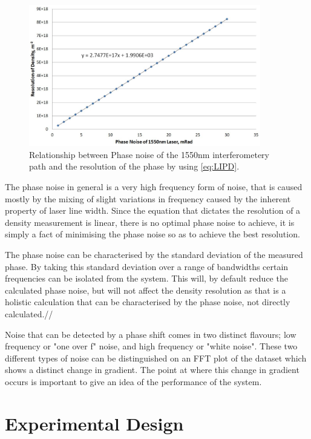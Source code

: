 \documentclass[12pt,a4paper,oneside]{report}
\begin{document}
\begin{figure}[H]
\includegraphics[width=0.9\textwidth, center,angle=0]{DImages/pn-density-relationship.JPG}
\caption{Relationship between Phase noise of the 1550nm interferometery path and the resolution of the phase by using \autoref{eq:LIPD}.}
\label{pn_density}
\end{figure}

The phase noise in general is a very high frequency form of noise, that is caused mostly by the mixing of slight variations in frequency caused by the inherent property of laser line width.
Since the equation that dictates the resolution of a density measurement is linear, there is no optimal phase noise to achieve, it is simply a fact of minimising the phase noise so as to achieve the best resolution. 

The phase noise can be characterised by the standard deviation of the measured phase. By taking this standard deviation over a range of bandwidths certain frequencies can be isolated from the system. This will, by default reduce the calculated phase noise, but will not affect the density resolution as that is a holistic calculation that can be characterised by the phase noise, not directly calculated.//

Noise that can be detected by a phase shift comes in two distinct flavours; low frequency or "one over f" noise, and high frequency or "white noise". These two different types of noise can be distinguished on an FFT plot of the dataset which shows a distinct change in gradient. The point at where this change in gradient occurs is important to give an idea of the performance of the system.

\section{Experimental Design}
\end{document}
